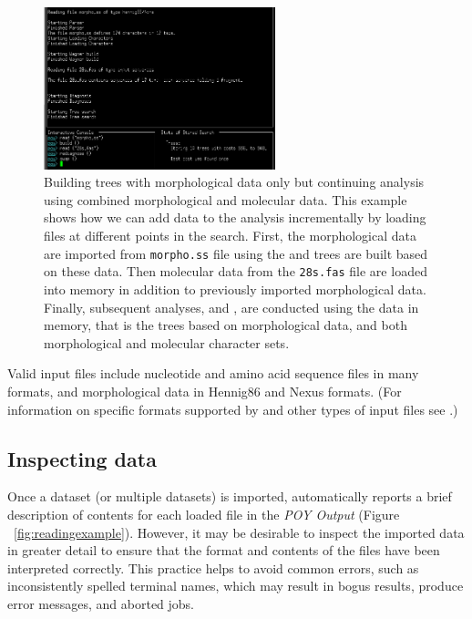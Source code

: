 {\begin{figure}[]
    \begin{center}
        \includegraphics[width=0.6\textwidth]{doc/figures/reading_example2.jpg}
    \end{center}
    \caption{Building trees with morphological data only but continuing analysis using combined morphological and molecular data. This example shows how we can add data to the analysis incrementally by loading files at different points in the search. First, the morphological data are imported from \texttt{morpho.ss} file using  the and trees are built based on these data. Then molecular data from the \texttt{28s.fas} file are loaded into memory in addition to previously imported morphological data. Finally, subsequent analyses,  and , are conducted using the data in memory, that is the trees based on morphological data, and both morphological and molecular character sets.}
    \label{fig:reading_example2}
\end{figure}

Valid input files include nucleotide and amino acid sequence files in many formats,
and morphological data in Hennig86 and Nexus formats. (For information on specific formats supported by \poy and other types of input files see .)

\subsection{Inspecting data}

Once a dataset (or multiple datasets) is imported, \poy automatically reports a brief description of contents for each loaded file in the \emph{POY Output} (Figure ~\ref{fig:readingexample}). However, it may be desirable to inspect the imported data in greater detail to ensure that the format and contents of the files have been interpreted correctly. This practice helps to avoid common errors, such as inconsistently spelled terminal names, which may result in bogus results, produce error messages, and aborted jobs.

}
